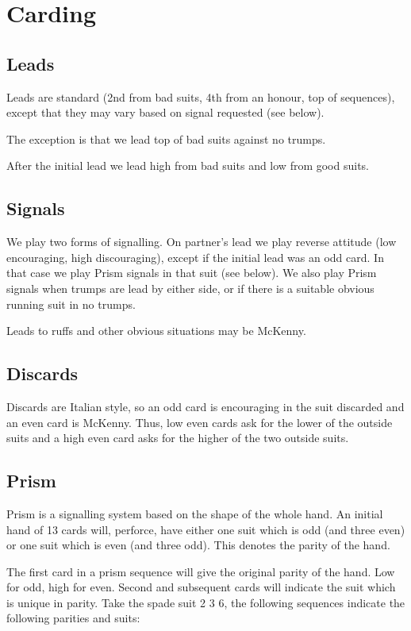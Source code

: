 \documentclass[a4paper,12pt]{article}
\begin{document}
\section{Carding}

\subsection{Leads}

Leads are standard (2nd from bad suits, 4th from an honour, top of sequences),
except that they may vary based on signal requested (see below).

The exception is that we lead top of bad suits against no trumps.

After the initial lead we lead high from bad suits and low from good suits.

\subsection{Signals}

We play two forms of signalling. On partner's lead we play reverse attitude
(low encouraging, high discouraging), except if the initial lead was an odd
card. In that case we play Prism signals in that suit (see below). We also play
Prism signals when trumps are lead by either side, or if there is a suitable
obvious running suit in no trumps.

Leads to ruffs and other obvious situations may be McKenny.

\subsection{Discards}

Discards are Italian style, so an odd card is encouraging in the suit discarded
and an even card is McKenny. Thus, low even cards ask for the lower of the
outside suits and a high even card asks for the higher of the two outside
suits.

\subsection{Prism}

Prism is a signalling system based on the shape of the whole hand. An initial
hand of 13 cards will, perforce, have either one suit which is odd (and three
even) or one suit which is even (and three odd). This denotes the parity of the
hand.

The first card in a prism sequence will give the original parity of the hand.
Low for odd, high for even. Second and subsequent cards will indicate the suit
which is unique in parity. Take the spade suit 2 3 6, the following sequences indicate
the following parities and suits:
\end{document}
